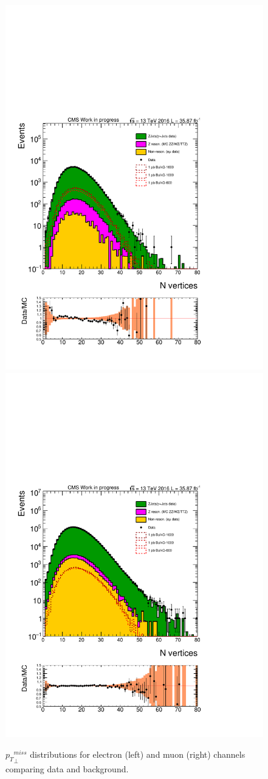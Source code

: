 \begin{figure}[htbp!]
\centering
\includegraphics[width=0.46\linewidth,page=23]{figures/ReMiniSummer16_DT_PhReMiniMCRcFixXsec_GMCPhPtWt_tightzpt50_puWeightsummer16_muoneg_gjet_metfilter_unblind_el_log_1pb.pdf}
\includegraphics[width=0.46\linewidth,page=23]{figures/ReMiniSummer16_DT_PhReMiniMCRcFixXsec_GMCPhPtWt_tightzpt50_puWeightsummer16_muoneg_gjet_metfilter_unblind_mu_log_1pb.pdf}
\caption{${p_{T}}^{miss}_\perp$ distributions for electron (left) and muon (right)
channels comparing data and background.}
\label{fig:gjet_metperp}
\end{figure}


